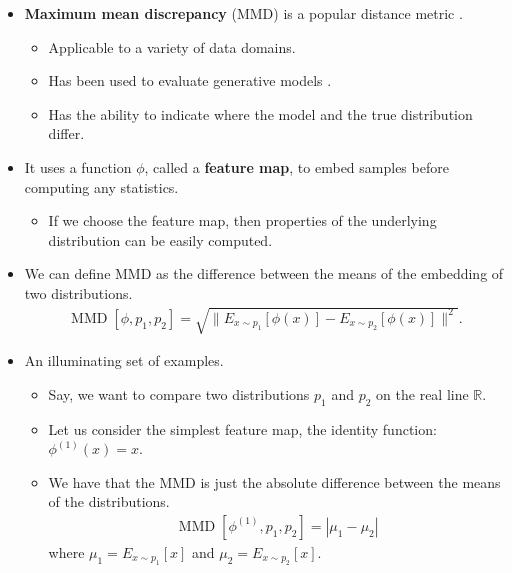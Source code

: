 \documentclass[10pt]{article}
\begin{document}
\begin{itemize}
    \item {\bf Maximum mean discrepancy} (MMD) is a popular distance metric \cite{Gretton:2012}.
    \begin{itemize}
        \item Applicable to a variety of data domains.
        \item Has been used to evaluate generative models \cite{Sutherland:2021, Borji:2018,Lueckman:2021}.
        \item Has the ability to indicate where the model and the true distribution differ.
    \end{itemize}
    
    \item It uses a function $\phi$, called a {\bf feature map}, to embed samples before computing any statistics.
    \begin{itemize}
        \item If we choose the feature map, then properties of the underlying distribution can be easily computed.
    \end{itemize}

    \item We can define MMD as the difference between the means of the embedding of two distributions.
    \begin{align*}
        \operatorname{MMD}[\phi,p_1,p_2] = \sqrt{ \big\| E_{x \sim p_1}[\phi(x)] - E_{x \sim p_2}[\phi(x)] \big\|^2}.
    \end{align*}

    \item An illuminating set of examples.
    \begin{itemize}
        \item Say, we want to compare two distributions $p_1$ and $p_2$ on the real line $\mathbb{R}$.
        
        \item Let us consider the simplest feature map, the identity function: $\phi^{(1)}(x) = x$. 
        
        \item We have that the MMD is just the absolute difference between the means of the distributions.
        \begin{align*}
            \operatorname{MMD}[\phi^{(1)}, p_1, p_2] = |\mu_1 - \mu_2|            
        \end{align*}
        where $\mu_1 = E_{x \sim p_1}[x]$ and $\mu_2 = E_{x \sim p_2}[x]$.


\end{itemize}
\end{itemize}
\end{document}
